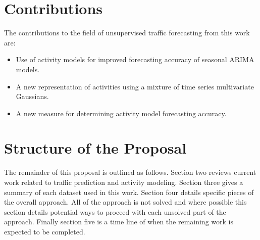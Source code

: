 \section{Contributions}  
The contributions to the field of unsupervised traffic forecasting from this work are:
\begin{itemize}
\item{Use of activity models for improved forecasting accuracy of seasonal ARIMA models.}
\item{A new representation of activities using a mixture of time series multivariate Gaussians.}
\item{A new measure for determining activity model forecasting accuracy.}
\end{itemize}

\section{Structure of the Proposal}
The remainder of this proposal is outlined as follows.  Section two reviews current work related to traffic prediction and activity modeling.  Section three gives a summary of each dataset used in this work.  Section four details specific pieces of the overall approach.  All of the approach is not solved and where possible this section details potential ways to proceed with each unsolved part of the approach.  Finally section five is a time line of when the remaining work is expected to be completed.

